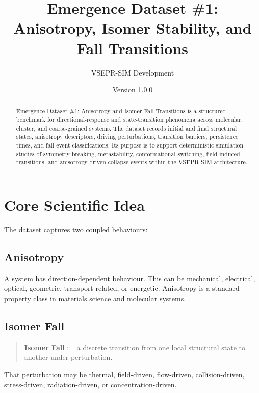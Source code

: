 \documentclass[11pt]{article}
\title{\textbf{Emergence Dataset \#1:} \\
\Large Anisotropy, Isomer Stability, and Fall Transitions}
\author{VSEPR-SIM Development}
\date{Version 1.0.0}
\begin{document}
\maketitle

\begin{abstract}
Emergence Dataset \#1: Anisotropy and Isomer-Fall Transitions is a structured
benchmark for directional-response and state-transition phenomena across
molecular, cluster, and coarse-grained systems. The dataset records initial
and final structural states, anisotropy descriptors, driving perturbations,
transition barriers, persistence times, and fall-event classifications.
Its purpose is to support deterministic simulation studies of symmetry breaking,
metastability, conformational switching, field-induced transitions, and
anisotropy-driven collapse events within the VSEPR-SIM architecture.
\end{abstract}

\tableofcontents
\newpage

\section{Core Scientific Idea}

The dataset captures two coupled behaviours:

\subsection{Anisotropy}

A system has direction-dependent behaviour. This can be mechanical, electrical,
optical, geometric, transport-related, or energetic. Anisotropy is a standard
property class in materials science and molecular systems.

\subsection{Isomer Fall}

\begin{quote}
\textbf{Isomer Fall} := a discrete transition from one local structural state
to another under perturbation.
\end{quote}

That perturbation may be thermal, field-driven, flow-driven, collision-driven,
stress-driven, radiation-driven, or concentration-driven.
\end{document}
